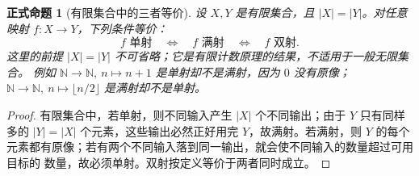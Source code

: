 \documentclass[UTF8,fontset=none,a4paper,11pt]{ctexart}
\theoremstyle{foundation-definition}
\theoremstyle{foundation-theorem}
\theoremstyle{foundation-proposition}
\newtheorem{proposition}[definition]{正式命题}
\theoremstyle{foundation-example}
\theoremstyle{foundation-remark}
\theoremstyle{foundation-theorem}
\begin{document}
\begin{proposition}[有限集合中的三者等价]\label{prop:finite-single-surj}
设 \(X,Y\) 是有限集合，且 \(|X|=|Y|\)。对任意映射 \(f:X\to Y\)，下列条件等价：
\[
f\text{ 单射}\quad\Longleftrightarrow\quad
f\text{ 满射}\quad\Longleftrightarrow\quad
f\text{ 双射}.
\]
这里的前提 \(|X|=|Y|\) 不可省略；它是有限计数原理的结果，不适用于一般无限集合。
例如 \(\mathbb N\to\mathbb N,\ n\mapsto n+1\) 是单射却不是满射，因为 \(0\) 没有原像；
\(\mathbb N\to\mathbb N,\ n\mapsto\lfloor n/2\rfloor\) 是满射却不是单射。
\end{proposition}

\begin{proof}
有限集合中，若单射，则不同输入产生 \(|X|\) 个不同输出；由于 \(Y\) 只有同样多的
\(|Y|=|X|\) 个元素，这些输出必然正好用完 \(Y\)，故满射。若满射，则 \(Y\) 的每个
元素都有原像；若有两个不同输入落到同一输出，就会使不同输入的数量超过可用目标的
数量，故必须单射。双射按定义等价于两者同时成立。
\end{proof}
\end{document}
